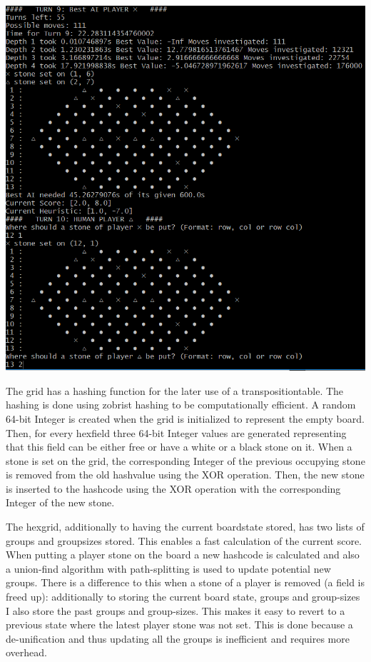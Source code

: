\documentclass[a4paper]{article}
\begin{document}
\includegraphics[scale=0.5]{"Sample interface"}


The grid has a hashing function for the later use of a transpositiontable. The hashing is done using zobrist hashing \cite{zobrist1970new} to be computationally efficient. A random 64-bit Integer is created when the grid is initialized to represent the empty board. Then, for every hexfield three 64-bit Integer values are generated representing that this field can be either free or have a white or a black stone on it. When a stone is set on the grid, the corresponding Integer of the previous occupying stone is removed from the old hashvalue using the XOR operation. Then, the new stone is inserted to the hashcode using the XOR operation with the corresponding Integer of the new stone.

The hexgrid, additionally to having the current boardstate stored, has two lists of groups and groupsizes stored. This enables a fast calculation of the current score. When putting a player stone on the board a new hashcode is calculated and also a union-find algorithm \cite{galler1964improved} with path-splitting is used to update potential new groups. There is a difference to this when a stone of a player is removed (a field is freed up): additionally to storing the current board state, groups and group-sizes I also store the past groups and group-sizes. This makes it easy to revert to a previous state where the latest player stone was not set. This is done because a de-unification and thus updating all the groups is inefficient and requires more overhead.
\end{document}
